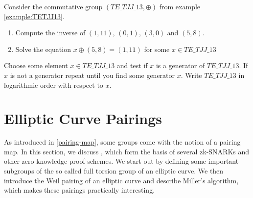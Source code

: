 \begin{exercise} Consider the commutative group $(TE\_TJJ\_13,\oplus)$ from example \ref{example:TETJJ13}.
\begin{enumerate}
\item Compute the inverse of $(1,11)$, $(0,1)$, $(3,0)$ and $(5,8)$.
\item Solve the equation $x \oplus (5,8) = (1,11) $ for some $x\in \mathit{TE\_TJJ\_13}$
\end{enumerate}
Choose some element $x\in \mathit{TE\_TJJ\_13}$ and test if $x$ is a generator of $\mathit{TE\_TJJ\_13}$. If $x$ is not a generator repeat until you find some generator $x$. Write $\mathit{TE\_TJJ\_13}$ in logarithmic order with respect to $x$.
\end{exercise}

\section{Elliptic Curve Pairings}
\label{sec:elliptic_curve_pairings}
As introduced in \ref{pairing-map}, some groups come with the notion of a pairing map. In this section, we discuss , which form the basis of several zk-SNARKs and other zero-knowledge proof schemes. We start out by defining some important subgroups of the so called full torsion group of an elliptic curve. We then introduce the Weil pairing of an elliptic curve and describe Miller's algorithm, which makes these pairings practically interesting.

